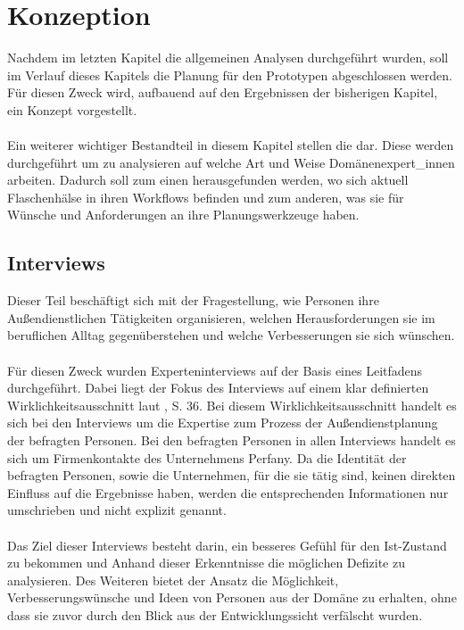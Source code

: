 \documentclass[Bachelorarbeit.tex]{subfiles}
\begin{document}
\chapter{Konzeption}
\label{chap:entwicklung}
Nachdem im letzten Kapitel die allgemeinen Analysen durchgeführt wurden, soll im Verlauf dieses Kapitels die Planung für den Prototypen abgeschlossen werden.
Für diesen Zweck wird, aufbauend auf den Ergebnissen der bisherigen Kapitel, ein Konzept vorgestellt.\\
\\
Ein weiterer wichtiger Bestandteil in diesem Kapitel stellen die  dar.
Diese  werden durchgeführt um zu analysieren auf welche Art und Weise  Domänenexpert\_innen arbeiten.
Dadurch soll zum einen herausgefunden werden, wo sich aktuell Flaschenhälse in ihren Workflows befinden und zum anderen, was sie für Wünsche und Anforderungen an ihre Planungswerkzeuge haben.\\


\section{Interviews}
\label{chap:analyse:sec:interviews}
Dieser Teil beschäftigt sich mit der Fragestellung, wie Personen ihre Außendienstlichen Tätigkeiten organisieren, welchen Herausforderungen sie im beruflichen Alltag gegenüberstehen und welche Verbesserungen sie sich wünschen.  \\
\\
Für diesen Zweck wurden Experteninterviews auf der Basis eines Leitfadens durchgeführt.
Dabei liegt der Fokus des Interviews auf einem klar definierten Wirklichkeitsausschnitt laut \cite{Mayer2006}, S. 36.
Bei diesem Wirklichkeitsausschnitt handelt es sich bei den Interviews um die Expertise zum Prozess der Außendienstplanung der befragten Personen.
Bei den befragten Personen in allen Interviews handelt es sich um Firmenkontakte des Unternehmens Perfany.
Da die Identität der befragten Personen, sowie die Unternehmen, für die sie tätig sind, keinen direkten Einfluss auf die Ergebnisse haben, werden die entsprechenden Informationen nur umschrieben und nicht explizit genannt.\\
\\
Das Ziel dieser Interviews besteht darin, ein besseres Gefühl für den Ist-Zustand zu bekommen und Anhand dieser Erkenntnisse die möglichen Defizite zu analysieren.
Des Weiteren bietet der Ansatz die Möglichkeit, Verbesserungswünsche und Ideen von Personen aus der Domäne zu erhalten, ohne dass sie zuvor durch den Blick aus der Entwicklungssicht verfälscht wurden.
\end{document}
